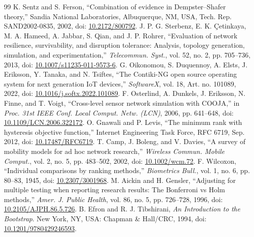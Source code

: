 \begin{thebibliography}{99}
 K. Sentz and S. Ferson, ``Combination of evidence in Dempster--Shafer theory,'' Sandia National Laboratories, Albuquerque, NM, USA, Tech. Rep. SAND2002-0835, 2002, doi: \href{https://doi.org/10.2172/800792}{10.2172/800792}.
 J. P. G. Sterbenz, E. K. {\c{C}}etinkaya, M. A. Hameed, A. Jabbar, S. Qian, and J. P. Rohrer, ``Evaluation of network resilience, survivability, and disruption tolerance: Analysis, topology generation, simulation, and experimentation,'' \emph{Telecommun. Syst.}, vol. 52, no. 2, pp. 705--736, 2013, doi: \href{https://doi.org/10.1007/s11235-011-9573-6}{10.1007/s11235-011-9573-6}.
 G. Oikonomou, S. Duquennoy, A. Elsts, J. Eriksson, Y. Tanaka, and N. Tsiftes, ``The Contiki-NG open source operating system for next generation IoT devices,'' \emph{SoftwareX}, vol. 18, Art. no. 101089, 2022, doi: \href{https://doi.org/10.1016/j.softx.2022.101089}{10.1016/j.softx.2022.101089}.
 F. Osterlind, A. Dunkels, J. Eriksson, N. Finne, and T. Voigt, ``Cross-level sensor network simulation with COOJA,'' in \emph{Proc. 31st IEEE Conf. Local Comput. Netw. (LCN)}, 2006, pp. 641--648, doi: \href{https://doi.org/10.1109/LCN.2006.322172}{10.1109/LCN.2006.322172}.
 O. Gnawali and P. Levis, ``The minimum rank with hysteresis objective function,'' Internet Engineering Task Force, RFC 6719, Sep. 2012, doi: \href{https://doi.org/10.17487/RFC6719}{10.17487/RFC6719}.
 T. Camp, J. Boleng, and V. Davies, ``A survey of mobility models for ad hoc network research,'' \emph{Wireless Commun. Mobile Comput.}, vol. 2, no. 5, pp. 483--502, 2002, doi: \href{https://doi.org/10.1002/wcm.72}{10.1002/wcm.72}.
 F. Wilcoxon, ``Individual comparisons by ranking methods,'' \emph{Biometrics Bull.}, vol. 1, no. 6, pp. 80--83, 1945, doi: \href{https://doi.org/10.2307/3001968}{10.2307/3001968}.
 M. Aickin and H. Gensler, ``Adjusting for multiple testing when reporting research results: The Bonferroni vs Holm methods,'' \emph{Amer. J. Public Health}, vol. 86, no. 5, pp. 726--728, 1996, doi: \href{https://doi.org/10.2105/AJPH.86.5.726}{10.2105/AJPH.86.5.726}.
 B. Efron and R. J. Tibshirani, \emph{An Introduction to the Bootstrap}. New York, NY, USA: Chapman \& Hall/CRC, 1994, doi: \href{https://doi.org/10.1201/9780429246593}{10.1201/9780429246593}.
\end{thebibliography}
